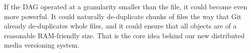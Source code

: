 If the DAG operated at a granularity smaller than the file, it could become even
more powerful. It could naturally de-duplicate chunks of files the way that Git
already de-duplicates whole files, and it could ensure that all objects are of a
reasonable RAM-friendly size. That is the core idea behind our new distributed
media versioning system.
